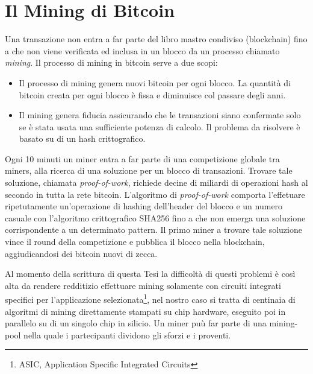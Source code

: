\section{Il Mining di Bitcoin}
Una transazione non entra a far parte del libro mastro condiviso (blockchain) fino a che non viene verificata ed inclusa in un blocco da un processo chiamato \textit{mining}. Il processo di mining in bitcoin serve a due scopi:
\begin{itemize}
	\item Il processo di mining genera nuovi bitcoin per ogni blocco. La quantità di bitcoin creata per ogni blocco è fissa e diminuisce col passare degli anni.
	\item Il mining genera fiducia assicurando che le transazioni siano confermate solo se è stata usata una sufficiente potenza di calcolo. Il problema da risolvere è basato su di un hash crittografico.
\end{itemize}
Ogni 10 minuti un miner entra a far parte di una competizione globale tra miners, alla ricerca di una soluzione per un blocco di transazioni. Trovare tale soluzione, chiamata \textit{proof-of-work}, richiede decine di miliardi di operazioni hash al secondo in tutta la rete bitcoin. L’algoritmo di \textit{proof-of-work} comporta l’effetuare ripetutamente un’operazione di hashing dell’header del blocco e un numero casuale con
l’algoritmo crittografico SHA256 fino a che non emerga una soluzione corrispondente a un determinato pattern. Il primo miner a trovare tale soluzione vince il round della competizione e pubblica il blocco nella blockchain, aggiudicandosi dei bitcoin nuovi di zecca.

Al momento della scrittura di questa Tesi  la difficoltà di questi problemi è così alta da rendere redditizio effettuare mining solamente con circuiti integrati specifici per l'applicazione selezionata\footnote{ASIC, Application Specific Integrated Circuits}, nel nostro caso si tratta di centinaia di algoritmi di mining direttamente stampati su chip hardware, eseguito poi in parallelo su di un singolo chip in silicio. Un miner puù far parte di una mining-pool nella quale i partecipanti dividono gli sforzi e i proventi.

